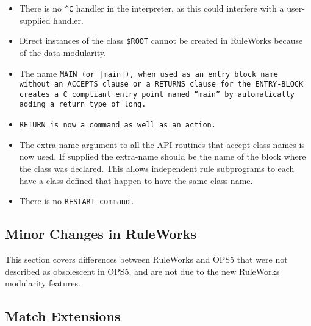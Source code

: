 \begin{itemize}
\item There is no \verb|^C| handler in the interpreter, as this could
  interfere with a user-supplied handler.

\item Direct instances of the class
  \verb|$ROOT| cannot be created in RuleWorks because of the data
  modularity.

\item The name \tt{MAIN} (or \verb,|main|,), when used as an entry
  block name without an \tt{ACCEPTS} clause or a \tt{RETURNS} clause
  for the \tt{ENTRY-BLOCK} creates a C compliant entry point named
  ``main'' by automatically adding a return type of long.

\item \tt{RETURN} is now a command as well as an action.

\item The extra-name argument to all the API routines that accept
  class names is now used. If supplied the extra-name should be the
  name of the block where the class was declared. This allows
  independent rule subprograms to each have a class defined that
  happen to have the same class name.

\item There is no \tt{RESTART} command.
\end{itemize}

\subsection{Minor Changes in RuleWorks}

This section covers differences between RuleWorks and OPS5 that were
not described as obsolescent in OPS5, and are not due to the new
RuleWorks modularity features.

\subsection{Match Extensions}

